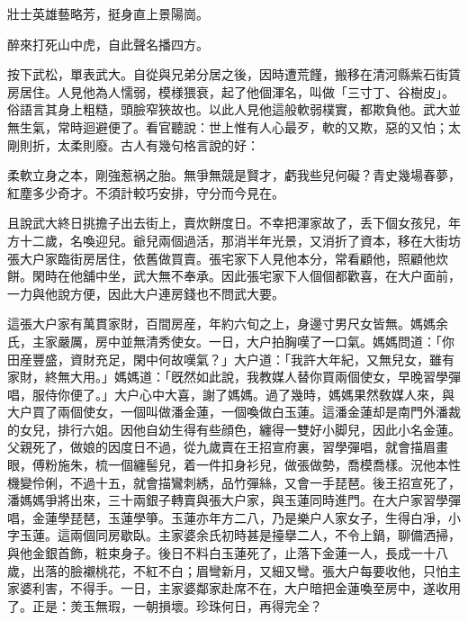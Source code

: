 \begin{myquote}
壯士英雄藝略芳，挺身直上景陽崗。

醉來打死山中虎，自此聲名播四方。
\end{myquote}
	
按下武松，單表武大。自從與兄弟分居之後，因時遭荒饉，搬移在清河縣紫石街賃房居住。人見他為人懦弱，模様猥衰，起了他個渾名，叫做「三寸丁、谷樹皮」。俗語言其身上粗糙，頭臉窄狹故也。以此人見他這般軟弱樸實，都欺負他。武大並無生氣，常時迴避便了。看官聽說：世上惟有人心最歹，軟的又欺，惡的又怕；太剛則折，太柔則廢。古人有幾句格言說的好：

\begin{myquote}
柔軟立身之本，剛強惹祸之胎。無爭無競是賢才，虧我些兒何礙？青史幾場春夢，紅塵多少奇才。不須計較巧安排，守分而今見在。
\end{myquote}

且說武大終日挑擔子出去街上，賣炊餅度日。不幸把渾家故了，丢下個女孩兒，年方十二歲，名喚迎兒。爺兒兩個過活，那消半年光景，又消折了資本，移在大街坊張大户家臨街房居住，依舊做買賣。張宅家下人見他本分，常看顧他，照顧他炊餅。閑時在他舖中坐，武大無不奉承。因此張宅家下人個個都歡喜，在大户面前，一力與他說方便，因此大户連房錢也不問武大要。

這張大户家有萬貫家財，百間房産，年約六旬之上，身邊寸男尺女皆無。媽媽余氏，主家嚴厲，房中並無清秀使女。一日，大户拍胸嘆了一口氣。媽媽問道：「你田産豐盛，資財充足，閑中何故嘆氣？」大户道：「我許大年紀，又無兒女，雖有家財，終無大用。」媽媽道：「旣然如此說，我教媒人替你買兩個使女，早晚習學彈唱，服侍你便了。」大户心中大喜，謝了媽媽。過了幾時，媽媽果然敎媒人來，與大户買了兩個使女，一個叫做潘金蓮，一個喚做白玉蓮。這潘金蓮却是南門外潘裁的女兒，排行六姐。因他自幼生得有些顔色，纏得一雙好小脚兒，因此小名金蓮。父親死了，做娘的因度日不過，從九歲賣在王招宣府裏，習學彈唱，就會描眉畫眼，傅粉施朱，梳一個纏髻兒，着一件扣身衫兒，做張做勢，喬模喬樣。況他本性機變伶俐，不過十五，就會描鸞刺綉，品竹彈絲，又會一手琵琶。後王招宣死了，潘媽媽爭將出來，三十兩銀子轉賣與張大户家，與玉蓮同時進門。在大户家習學彈唱，金蓮學琵琶，玉蓮學箏。玉蓮亦年方二八，乃是樂户人家女子，生得白凈，小字玉蓮。這兩個同房歇臥。主家婆余氏初時甚是擡擧二人，不令上鍋，聊備洒掃，與他金銀首飾，粧束身子。後日不料白玉蓮死了，止落下金蓮一人，長成一十八歲，出落的臉襯桃花，不紅不白；眉彎新月，又細又彎。張大户每要收他，只怕主家婆利害，不得手。一日，主家婆鄰家赴席不在，大户暗把金蓮喚至房中，遂收用了。正是：羙玉無瑕，一朝損壞。珍珠何日，再得完全？

